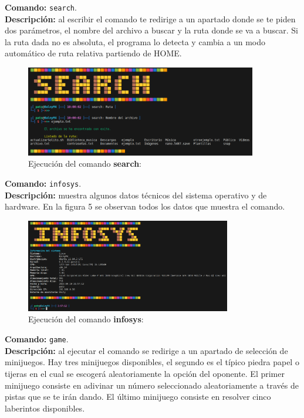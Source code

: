 \documentclass[titlepage]{article}
\begin{document}
\noindent
\textbf{Comando:} \verb|search|. \\
\textbf{Descripción:} al escribir el comando te redirige a un apartado donde se te piden dos parámetros, el nombre del archivo a buscar y la ruta donde se va a buscar. Si la ruta dada no es absoluta, el programa lo detecta y cambia a un modo automático de ruta relativa partiendo de HOME.

\begin{figure}[H]
    \centering
    \includegraphics[width=0.9\textwidth]{search.png}
    \caption{Ejecución del comando \textbf{search}:}
    \label{fig:ejemplo}
\end{figure}

\noindent
\textbf{Comando:} \verb|infosys|. \\
\textbf{Descripción:} muestra algunos datos técnicos del sistema operativo y de hardware. En la figura 5 se observan todos los datos que muestra el comando.

\begin{figure}[H]
    \centering
    \includegraphics[width=0.8\textwidth]{infosys.png}
    \caption{Ejecución del comando \textbf{infosys}:}
    \label{fig:ejemplo}
\end{figure}

\noindent
\textbf{Comando:} \verb|game|. \\
\textbf{Descripción:} al ejecutar el comando se redirige a un apartado de selección de minijuegos. Hay tres minijuegos disponibles, el segundo es el típico piedra papel o tijeras en el cual se escogerá aleatoriamente la opción del oponente. El primer minijuego consiste en adivinar un número seleccionado aleatoriamente a través de pistas que se te irán dando. El último minijuego consiste en resolver cinco laberintos disponibles. 
\end{document}
